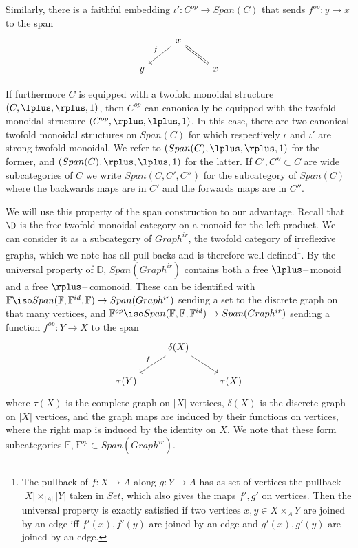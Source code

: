 Similarly, there is a faithful embedding $\iota':C^{op}\rightarrow{} Span(C)$ that sends $f^{op}:y\rightarrow x$ to the span
\[\begin{tikzcd}
  & x \arrow[ld, "f"'] \arrow[rd, equal] &   \\
y &                               & x
\end{tikzcd}\]

If furthermore $C$ is equipped with a twofold monoidal structure $(C,\lplus,\rplus,1)$, then $C^{op}$ can canonically be equipped with the twofold monoidal structure $(C^{op},\rplus,\lplus,1)$. In this case, there are two canonical twofold monoidal structures on $Span(C)$ for which respectively $\iota$ and $\iota'$ are strong twofold monoidal. We refer to $(Span(C),\lplus,\rplus,1)$ for the former, and $(Span(C),\rplus,\lplus,1)$ for the latter. If $C',C''\subset C$ are wide subcategories of $C$ we write $Span(C,C',C'')$ for the subcategory of $Span(C)$ where the backwards maps are in $C'$ and the forwards maps are in $C''$.

We will use this property of the span construction to our advantage. Recall that $\D$ is the free twofold monoidal category on a monoid for the left product. We can consider it as a subcategory of $Graph^{ir}$, the twofold category of irreflexive graphs, which we note has all pull-backs and is therefore well-defined\footnote{The pullback of $f:X\rightarrow A$ along $g:Y\rightarrow A$ has as set of vertices the pullback $|X|\times_{|A|} |Y|$ taken in $Set$, which also gives the maps $f',g'$ on vertices. Then the universal property is exactly satisfied if two vertices $x,y\in X\times_AY$ are joined by an edge iff $f'(x),f'(y)$ are joined by an edge and $g'(x),g'(y)$ are joined by an edge.}. By the universal property of $\mathbb{D}$, $Span(Graph^{ir})$ contains both a free $\lplus-$monoid and a free $\rplus-$comonoid. These can be identified with 
$\mathbb{F}\iso Span(\mathbb{F},\mathbb{F}^{id},\mathbb{F})\rightarrow Span(Graph^{ir})$ sending a set to the discrete graph on that many vertices, and $\mathbb{F}^{op}\iso Span(\mathbb{F},\mathbb{F},\mathbb{F}^{id})\rightarrow Span(Graph^{ir})$ sending a function $f^{op}:Y\rightarrow X$ to the span 
\[\begin{tikzcd}
        & \delta(X) \arrow[rd] \arrow[ld, "f"'] &         \\
\tau(Y) &                                     & \tau(X)
\end{tikzcd}\]
where $\tau(X)$ is the complete graph on $|X|$ vertices, $\delta(X)$ is the discrete graph on $|X|$ vertices, and the graph maps are induced by their functions on vertices, where the right map is induced by the identity on $X$. We note that these form subcategories $\mathbb{F},\mathbb{F}^{op}\subset Span(Graph^{ir})$. 

